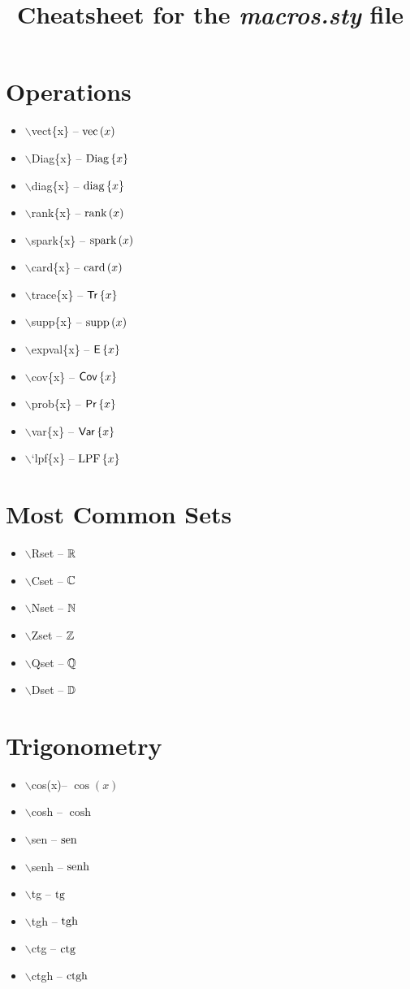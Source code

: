 \documentclass[twocolumn, a4paper]{article}
\title{Cheatsheet for the \textit{macros.sty} file}
\begin{document}
	\maketitle
	
	\section{Operations}
	\begin{itemize}
	\item $\backslash$vect\{x\} -- $ \textrm{vec} \left( x \right) $ 
	\item $\backslash$Diag\{x\} -- $ \textrm{Diag} \left\lbrace x \right\rbrace $ 
	\item $\backslash$diag\{x\} -- $ \textrm{diag} \left\lbrace x \right\rbrace $ 
	\item $\backslash$rank\{x\} -- $ \textrm{rank} \left( x \right) $ 
	\item $\backslash$spark\{x\} -- $ \textrm{spark}\left( x \right) $ 
	\item $\backslash$card\{x\} -- $ \textrm{card} \left( x \right) $
	\item $\backslash$trace\{x\} -- $ \mathsf{Tr} \left\lbrace x \right\rbrace $
	\item $\backslash$supp\{x\} -- $ \textrm{supp} \left( x \right) $
	\item $\backslash$expval\{x\} -- $ \mathsf{E} \left\lbrace x \right\rbrace $
	\item $\backslash$cov\{x\} -- $ \mathsf{Cov} \left\lbrace x \right\rbrace $
	\item $\backslash$prob\{x\} -- $ \mathsf{Pr} \left\lbrace x \right\rbrace $
	\item $\backslash$var\{x\} -- $ \mathsf{Var} \left\lbrace x \right\rbrace $
	\item $\backslash$`lpf\{x\} -- $ \mathrm{LPF} \left\lbrace x \right\rbrace $
	\end{itemize}
	
	\section{Most Common Sets}
	\begin{itemize}
		\item $\backslash$Rset -- $\mathbb{R}$ 
		\item $\backslash$Cset -- $\mathbb{C}$ 
		\item $\backslash$Nset -- $\mathbb{N}$ 
		\item $\backslash$Zset -- $\mathbb{Z}$ 
		\item $\backslash$Qset -- $\mathbb{Q}$ 
		\item $\backslash$Dset -- $\mathbb{D}$ 
	\end{itemize}
	\section{Trigonometry}
	\begin{itemize}
		\item $\backslash$cos(x)-- $\cos(x)$ 
		\item $\backslash$cosh -- $\cosh$ 
		\item $\backslash$sen -- $\textrm{sen}$ 
		\item $\backslash$senh -- $\textrm{senh}$ 
		\item $\backslash$tg -- $\textrm{tg}$ 
		\item $\backslash$tgh -- $\textrm{tgh}$ 
		\item $\backslash$ctg -- $\textrm{ctg}$ 
		\item $\backslash$ctgh -- $\textrm{ctgh}$ 
	\end{itemize}
	
\end{document}

